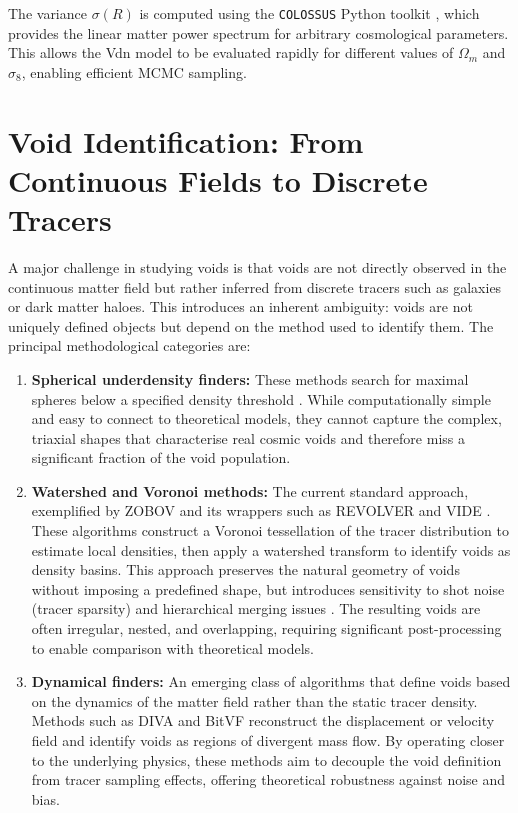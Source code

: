 \documentclass[12pt]{report}
\begin{document}
The variance $\sigma(R)$ is computed using the \texttt{COLOSSUS} Python toolkit \citep{Diemer2018}, which provides the linear matter power spectrum for arbitrary cosmological parameters. This allows the Vdn model to be evaluated rapidly for different values of $\Omega_m$ and $\sigma_8$, enabling efficient MCMC sampling.


\section{Void Identification: From Continuous Fields to Discrete Tracers}
\label{sec:void_id_methods}

A major challenge in studying voids is that voids are not directly observed in the continuous matter field but rather inferred from discrete tracers such as galaxies or dark matter haloes. This introduces an inherent ambiguity: voids are not uniquely defined objects but depend on the method used to identify them. The principal methodological categories are:

\begin{enumerate}
    \item \textbf{Spherical underdensity finders:} These methods search for maximal spheres below a specified density threshold \citep{Ceccarelli2009}. While computationally simple and easy to connect to theoretical models, they cannot capture the complex, triaxial shapes that characterise real cosmic voids and therefore miss a significant fraction of the void population.

    \item \textbf{Watershed and Voronoi methods:} The current standard approach, exemplified by ZOBOV \citep{Neyrinck2008} and its wrappers such as REVOLVER \citep{Nadathur2019} and VIDE \citep{Sutter2015}. These algorithms construct a Voronoi tessellation of the tracer distribution to estimate local densities, then apply a watershed transform to identify voids as density basins. This approach preserves the natural geometry of voids without imposing a predefined shape, but introduces sensitivity to shot noise (tracer sparsity) and hierarchical merging issues \citep{Nadathur2015a}. The resulting voids are often irregular, nested, and overlapping, requiring significant post-processing to enable comparison with theoretical models.

    \item \textbf{Dynamical finders:} An emerging class of algorithms that define voids based on the dynamics of the matter field rather than the static tracer density. Methods such as DIVA \citep{Lavaux2010,Elyiv2015} and BitVF \citep{Sartori2025} reconstruct the displacement or velocity field and identify voids as regions of divergent mass flow. By operating closer to the underlying physics, these methods aim to decouple the void definition from tracer sampling effects, offering theoretical robustness against noise and bias.
\end{enumerate}
\end{document}
